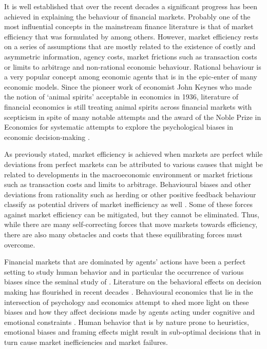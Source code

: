 \documentclass[
  letterpaper,
  DIV=11,
  numbers=noendperiod]{scrartcl}
\begin{document}
It is well established that over the recent decades a significant
progress has been achieved in explaining the behaviour of financial
markets. Probably one of the most influential concepts in the mainstream
finance literature is that of market efficiency that was formulated by
\citet{fama1970efficient} among others. However, market efficiency rests
on a series of assumptions that are mostly related to the existence of
costly and asymmetric information, agency costs, market frictions such
as transaction costs or limits to arbitrage and non-rational economic
behaviour. Rational behaviour is a very popular concept among economic
agents that is in the epic-enter of many economic models. Since the
pioneer work of economist John Keynes who made the notion of `animal
spirits' acceptable in economics in 1936, literature of financial
economics is still treating animal spirits across financial markets with
scepticism in spite of many notable attempts
\citep{kahneman2003maps, shiller2005behavioral, dai2020animal} and the
award of the Noble Prize in Economics for systematic attempts to explore
the psychological biases in economic decision-making
\citep{kahneman2003maps}.

As previously stated, market efficiency is achieved when markets are
perfect while deviations from perfect markets can be attributed to
various causes that might be related to developments in the
macroeconomic environment or market frictions such as transaction costs
and limits to arbitrage. Behavioural biases and other deviations from
rationality such as herding or other positive feedback behaviour
classify as potential drivers of market inefficiency as well
\citep{aggarwal2014animal}. Some of these forces against market
efficiency can be mitigated, but they cannot be eliminated. Thus, while
there are many self-correcting forces that move markets towards
efficiency, there are also many obstacles and costs that these
equilibrating forces must overcome.

Financial markets that are dominated by agents' actions have been a
perfect setting to study human behavior and in particular the occurrence
of various biases since the seminal study of
\citet{tversky1974judgment}. Literature on the behavioral effects on
decision making has flourished in recent decades \citep[see][ for a
detailed review]{aggarwal2014animal}. Behavioural economics that lie in
the intersection of psychology and economics attempt to shed more light
on these biases and how they affect decisions made by agents acting
under cognitive and emotional constraints
\citep{mullainathan2000behavioral}. Human behavior that is by nature
prone to heuristics, emotional biases and framing effects
\citep{aggarwal2014animal} might result in sub-optimal decisions that in
turn cause market inefficiencies and market failures.
\end{document}
